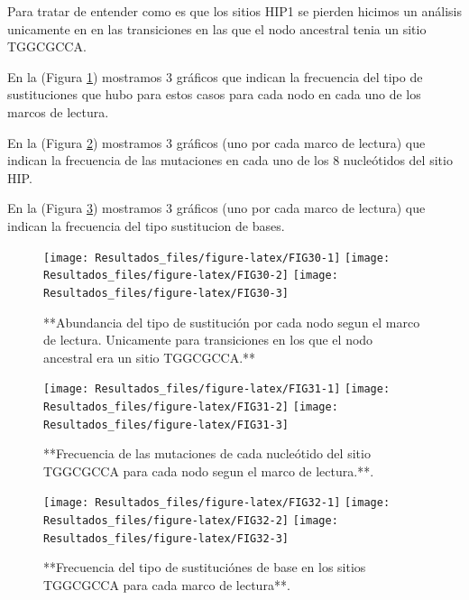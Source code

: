 \documentclass[
]{book}
\begin{document}
Para tratar de entender como es que los sitios HIP1 se pierden hicimos un análisis unicamente en en las transiciones en las que el nodo ancestral tenia un sitio TGGCGCCA.

En la (Figura \ref{fig:FIG30}) mostramos 3 gráficos que indican la frecuencia del tipo de sustituciones que hubo para estos casos para cada nodo en cada uno de los marcos de lectura.

En la (Figura \ref{fig:FIG31}) mostramos 3 gráficos (uno por cada marco de lectura) que indican la frecuencia de las mutaciones en cada uno de los 8 nucleótidos del sitio HIP.

En la (Figura \ref{fig:FIG32}) mostramos 3 gráficos (uno por cada marco de lectura) que indican la frecuencia del tipo sustitucion de bases.

\begin{figure}

{\centering \texttt{[image: Resultados\_files/figure-latex/FIG30-1]} \texttt{[image: Resultados\_files/figure-latex/FIG30-2]} \texttt{[image: Resultados\_files/figure-latex/FIG30-3]} 

}

\caption{**Abundancia del tipo de sustitución por cada nodo segun el marco de lectura. Unicamente para transiciones en los que el nodo ancestral era un sitio TGGCGCCA.**}\label{fig:FIG30}
\end{figure}

\begin{figure}

{\centering \texttt{[image: Resultados\_files/figure-latex/FIG31-1]} \texttt{[image: Resultados\_files/figure-latex/FIG31-2]} \texttt{[image: Resultados\_files/figure-latex/FIG31-3]} 

}

\caption{**Frecuencia de las mutaciones de cada nucleótido del sitio TGGCGCCA para cada nodo segun el marco de lectura.**.}\label{fig:FIG31}
\end{figure}

\begin{figure}

{\centering \texttt{[image: Resultados\_files/figure-latex/FIG32-1]} \texttt{[image: Resultados\_files/figure-latex/FIG32-2]} \texttt{[image: Resultados\_files/figure-latex/FIG32-3]} 

}

\caption{**Frecuencia del tipo de sustituciónes de base en los sitios TGGCGCCA para cada marco de lectura**.}\label{fig:FIG32}
\end{figure}
\end{document}
